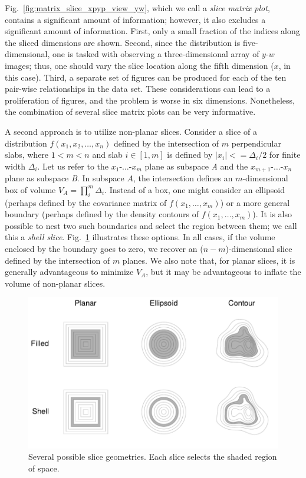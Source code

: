\documentclass[%
 reprint,
 amsmath,amssymb,
 aps,
prstab,
]{revtex4-2}
\begin{document}
Fig.~\ref{fig:matrix_slice_xpyp_view_yw}, which we call a \textit{slice matrix plot}, contains a significant amount of information; however, it also excludes a significant amount of information. First, only a small fraction of the indices along the sliced dimensions are shown. Second, since the distribution is five-dimensional, one is tasked with observing a three-dimensional array of $y$-$w$ images; thus, one should vary the slice location along the fifth dimension ($x$, in this case). Third, a separate set of figures can be produced for each of the ten pair-wise relationships in the data set. These considerations can lead to a proliferation of figures, and the problem is worse in six dimensions. Nonetheless, the combination of several slice matrix plots can be very informative.

A second approach is to utilize non-planar slices. Consider a slice of a distribution $f(x_1, x_2, \dots, x_n)$ defined by the intersection of $m$ perpendicular slabs, where $1 < m < n$ and slab $i\in[1, m]$ is defined by $|x_i| <= \Delta_i / 2$ for finite width $\Delta_i$. Let us refer to the $x_1$-$\dots$-$x_m$ plane as subspace \textit{A} and the $x_{m + 1}$-$\dots$-$x_n$ plane as subspace \textit{B}. In subspace $A$, the intersection defines an $m$-dimensional box of volume $V_A = \prod_{i}^{m}\Delta_i$. Instead of a box, one might consider an ellipsoid (perhaps defined by the covariance matrix of $f(x_1, \dots, x_m)$) or a more general boundary (perhaps defined by the density contours of $f(x_1, \dots, x_m)$). It is also possible to nest two such boundaries and select the region between them; we call this a \textit{shell slice}. Fig.~\ref{fig:slices} illustrates these options. In all cases, if the volume enclosed by the boundary goes to zero, we recover an ($n - m$)-dimensional slice defined by the intersection of $m$ planes. We also note that, for planar slices, it is generally advantageous to minimize $V_A$, but it may be advantageous to inflate the volume of non-planar slices.
%
\begin{figure}
    \centering
    \includegraphics[width=0.85\columnwidth]{fig5.pdf}
    \caption{Several possible slice geometries. Each slice selects the shaded region of space.}
    \label{fig:slices}
\end{figure}
%
\end{document}
